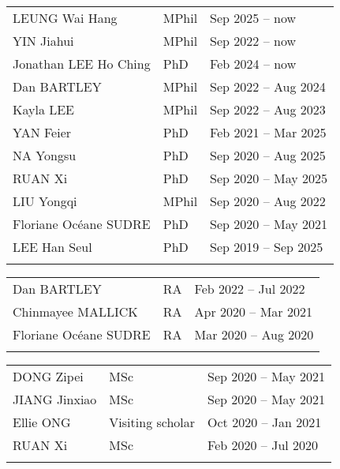 \documentclass[letterpaper]{article}
\begin{document}
\begin{tabularx}{\textwidth}{XXX}
  LEUNG Wai Hang          & MPhil & Sep 2025 -- now\\
  YIN Jiahui              & MPhil & Sep 2022 -- now\\
  Jonathan LEE Ho Ching   & PhD   & Feb 2024 -- now\\
  Dan BARTLEY             & MPhil & Sep 2022 -- Aug 2024\\
  Kayla LEE               & MPhil & Sep 2022 -- Aug 2023\\
  YAN Feier               & PhD   & Feb 2021 -- Mar 2025\\
  NA Yongsu               & PhD   & Sep 2020 -- Aug 2025\\
  RUAN Xi                 & PhD   & Sep 2020 -- May 2025\\
  LIU Yongqi              & MPhil & Sep 2020 -- Aug 2022\\
  Floriane Oc\'eane SUDRE & PhD   & Sep 2020 -- May 2021\\
  LEE Han Seul            & PhD   & Sep 2019 -- Sep 2025\\
  \\
\end{tabularx}

\begin{tabularx}{\textwidth}{XXX}
  Dan BARTLEY             & RA    & Feb 2022 -- Jul 2022\\
  Chinmayee MALLICK       & RA    & Apr 2020 -- Mar 2021\\
  Floriane Oc\'eane SUDRE & RA    & Mar 2020 -- Aug 2020\\
  \\
\end{tabularx}

\begin{tabularx}{\textwidth}{XXX}
  DONG Zipei        & MSc               & Sep 2020 -- May 2021\\
  JIANG Jinxiao     & MSc               & Sep 2020 -- May 2021\\
  Ellie ONG         & Visiting scholar  & Oct 2020 -- Jan 2021\\
  RUAN Xi           & MSc               & Feb 2020 -- Jul 2020\\
  \\
\end{tabularx}
  
\end{document}
